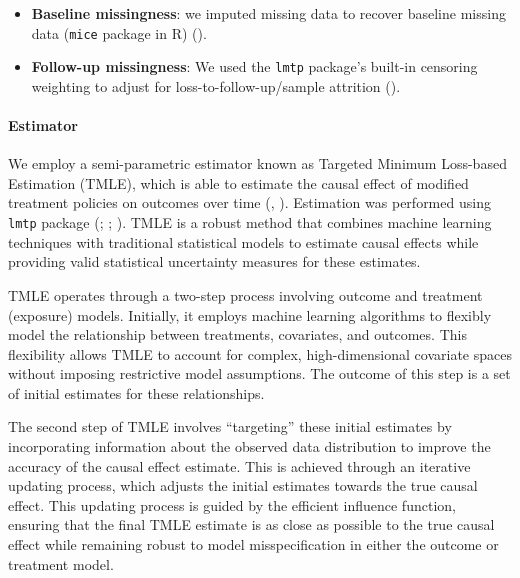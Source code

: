 \documentclass[
  singlecolumn]{article}
\let\oldparagraph\paragraph
\renewcommand{\paragraph}[1]{\oldparagraph{#1}\mbox{}}
\providecommand{\tightlist}{%
  \setlength{\itemsep}{0pt}\setlength{\parskip}{0pt}}\usepackage{longtable,booktabs,array}
\begin{document}
\begin{itemize}
\tightlist
\item
  \textbf{Baseline missingness}: we imputed missing data to recover
  baseline missing data (\texttt{mice} package in R)
  ().
\item
  \textbf{Follow-up missingness}: We used the \texttt{lmtp} package's
  built-in censoring weighting to adjust for loss-to-follow-up/sample
  attrition ().
\end{itemize}

\paragraph{Estimator}\label{estimator}

We employ a semi-parametric estimator known as Targeted Minimum
Loss-based Estimation (TMLE), which is able to estimate the causal
effect of modified treatment policies on outcomes over time
(,
). Estimation was performed using
\texttt{lmtp} package (; ;
). TMLE is a robust
method that combines machine learning techniques with traditional
statistical models to estimate causal effects while providing valid
statistical uncertainty measures for these estimates.

TMLE operates through a two-step process involving outcome and treatment
(exposure) models. Initially, it employs machine learning algorithms to
flexibly model the relationship between treatments, covariates, and
outcomes. This flexibility allows TMLE to account for complex,
high-dimensional covariate spaces without imposing restrictive model
assumptions. The outcome of this step is a set of initial estimates for
these relationships.

The second step of TMLE involves ``targeting'' these initial estimates
by incorporating information about the observed data distribution to
improve the accuracy of the causal effect estimate. This is achieved
through an iterative updating process, which adjusts the initial
estimates towards the true causal effect. This updating process is
guided by the efficient influence function, ensuring that the final TMLE
estimate is as close as possible to the true causal effect while
remaining robust to model misspecification in either the outcome or
treatment model.
\end{document}
